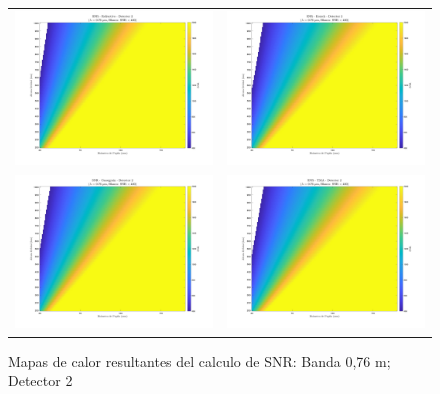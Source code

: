 \begin{landscape}
\begin{figure}[p]
\centering
\vspace*{0.3cm}

\vspace{0.3cm}
\setlength{\tabcolsep}{4pt}
\renewcommand{\arraystretch}{0}

\begin{tabular}{cc}
\includegraphics[width=0.48\linewidth]{4.Payload/SNR/SNR_Lambda3_Detector5_Telescopio1_heatmap.jpg} &
\includegraphics[width=0.48\linewidth]{4.Payload/SNR/SNR_Lambda3_Detector5_Telescopio2_heatmap.jpg} \\
\includegraphics[width=0.48\linewidth]{4.Payload/SNR/SNR_Lambda3_Detector5_Telescopio3_heatmap.jpg} &
\includegraphics[width=0.48\linewidth]{4.Payload/SNR/SNR_Lambda3_Detector5_Telescopio4_heatmap.jpg} \\
\end{tabular}
\caption{Mapas de calor resultantes del calculo de SNR: Banda 0,76 \textmu m; Detector 2}
\end{figure}
\end{landscape}

